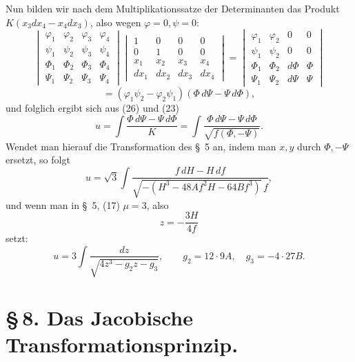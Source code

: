 \documentclass[11pt]{article}
\begin{document}
Nun bilden wir nach dem Multiplikationssatze der Determinanten das Produkt $K(x_3dx_4-x_4dx_3)$, also wegen $\varphi=0,\psi=0$:
\[
\begin{vmatrix}
\varphi_1&\varphi_2&\varphi_3&\varphi_4\\
\psi_1&\psi_2&\psi_3&\psi_4\\
\Phi_1&\Phi_2&\Phi_3&\Phi_4\\
\Psi_1&\Psi_2&\Psi_3&\Psi_4
\end{vmatrix}
\begin{vmatrix}
1&0&0&0\\
0&1&0&0\\
x_1&x_2&x_3&x_4\\
dx_1&dx_2&dx_3&dx_4
\end{vmatrix}
=
\begin{vmatrix}
\varphi_1&\varphi_2&0&0\\
\psi_1&\psi_2&0&0\\
\Phi_1&\Phi_2&d\Phi&\Phi\\
\Psi_1&\Psi_2&d\Psi&\Psi
\end{vmatrix}
\]
\[
=(\varphi_1\psi_2-\varphi_2\psi_1)(\Phi\,d\Psi-\Psi\,d\Phi),
\]
und folglich ergibt sich aus (26) und (23)
\begin{equation}
u=\int\frac{\Phi\,d\Psi-\Psi\,d\Phi}{K}
=\int\frac{\Phi\,d\Psi-\Psi\,d\Phi}{\sqrt{f(\Phi,-\Psi)}}.
\tag{27}
\end{equation}
Wendet man hierauf die Transformation des \S~5 an, indem man $x,y$ durch $\Phi,-\Psi$ ersetzt, so folgt
\[
u=\sqrt3\int \frac{f\,dH-H\,df}{\sqrt{-(H^3-48Af^2H-64Bf^3)}\,f},
\]
und wenn man in \S~5, (17) $\mu=3$, also
\[
z=-\frac{3H}{4f}
\]
setzt:
\[
u=3\int\frac{dz}{\sqrt{4z^3-g_2z-g_3}},
\qquad
g_2=12\cdot9A,\quad g_3=-4\cdot27B.
\]

\section*{\S\,8. Das Jacobische Transformationsprinzip.}
\end{document}
